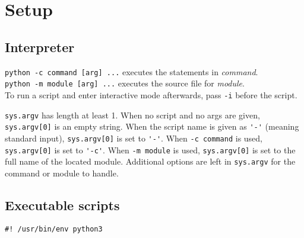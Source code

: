 \section{Setup}

\subsection{Interpreter}

\verb=python -c command [arg] ...= executes the statements in \emph{command}.\\
\verb=python -m module [arg] ...= executes the source file for \emph{module}.\\
To run a script and enter interactive mode afterwards,
pass \verb=-i= before the script.

\verb=sys.argv= has length at least 1.
When no script and no args are given, \verb=sys.argv[0]= is an empty string.
When the script name is given as \verb='-'= (meaning standard input),
\verb=sys.argv[0]= is set to \verb='-'=.
When \verb=-c command= is used, \verb=sys.argv[0]= is set to \verb='-c'=.
When \verb=-m module= is used,
\verb=sys.argv[0]= is set to the full name of the located module.
Additional options are left in \verb=sys.argv=
for the command or module to handle.

\subsection{Executable scripts}

\verb=#! /usr/bin/env python3=
